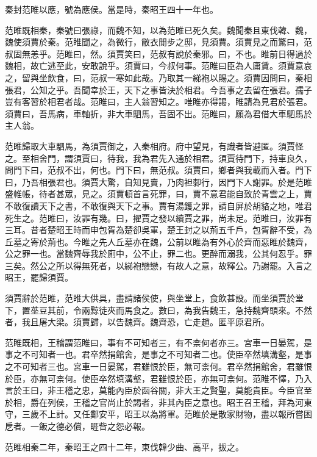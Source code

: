秦封范睢以應，號為應侯。當是時，秦昭王四十一年也。

范睢既相秦，秦號曰張祿，而魏不知，以為范睢已死久矣。魏聞秦且東伐韓、魏，魏使須賈於秦。范睢聞之，為微行，敝衣閒步之邸，見須賈。須賈見之而驚曰，范叔固無恙乎。范睢曰，然。須賈笑曰，范叔有說於秦邪。曰，不也。睢前日得過於魏相，故亡逃至此，安敢說乎。須賈曰，今叔何事。范睢曰臣為人庸賃。須賈意哀之，留與坐飲食，曰，范叔一寒如此哉。乃取其一綈袍以賜之。須賈因問曰，秦相張君，公知之乎。吾聞幸於王，天下之事皆決於相君。今吾事之去留在張君。孺子豈有客習於相君者哉。范睢曰，主人翁習知之。唯睢亦得謁，睢請為見君於張君。須賈曰，吾馬病，車軸折，非大車駟馬，吾固不出。范睢曰，願為君借大車駟馬於主人翁。

范睢歸取大車駟馬，為須賈御之，入秦相府。府中望見，有識者皆避匿。須賈怪之。至相舍門，謂須賈曰，待我，我為君先入通於相君。須賈待門下，持車良久，問門下曰，范叔不出，何也。門下曰，無范叔。須賈曰，鄉者與我載而入者。門下曰，乃吾相張君也。須賈大驚，自知見賣，乃肉袒厀行，因門下人謝罪。於是范睢盛帷帳，待者甚眾，見之。須賈頓首言死罪，曰，賈不意君能自致於青雲之上，賈不敢復讀天下之書，不敢復與天下之事。賈有湯鑊之罪，請自屏於胡貉之地，唯君死生之。范睢曰，汝罪有幾。曰，擢賈之發以續賈之罪，尚未足。范睢曰，汝罪有三耳。昔者楚昭王時而申包胥為楚卻吳軍，楚王封之以荊五千戶，包胥辭不受，為丘墓之寄於荊也。今睢之先人丘墓亦在魏，公前以睢為有外心於齊而惡睢於魏齊，公之罪一也。當魏齊辱我於廁中，公不止，罪二也。更醉而溺我，公其何忍乎。罪三矣。然公之所以得無死者，以綈袍戀戀，有故人之意，故釋公。乃謝罷。入言之昭王，罷歸須賈。

須賈辭於范睢，范睢大供具，盡請諸侯使，與坐堂上，食飲甚設。而坐須賈於堂下，置莝豆其前，令兩黥徒夾而馬食之。數曰，為我告魏王，急持魏齊頭來。不然者，我且屠大梁。須賈歸，以告魏齊。魏齊恐，亡走趙。匿平原君所。

范睢既相，王稽謂范睢曰，事有不可知者三，有不柰何者亦三。宮車一日晏駕，是事之不可知者一也。君卒然捐館舍，是事之不可知者二也。使臣卒然填溝壑，是事之不可知者三也。宮車一日晏駕，君雖恨於臣，無可柰何。君卒然捐館舍，君雖恨於臣，亦無可柰何。使臣卒然填溝壑，君雖恨於臣，亦無可柰何。范睢不懌，乃入言於王曰，非王稽之忠，莫能內臣於函谷關，非大王之賢聖，莫能貴臣。今臣官至於相，爵在列侯，王稽之官尚止於謁者，非其內臣之意也。昭王召王稽，拜為河東守，三歲不上計。又任鄭安平，昭王以為將軍。范睢於是散家財物，盡以報所嘗困戹者。一飯之德必償，睚眥之怨必報。

范睢相秦二年，秦昭王之四十二年，東伐韓少曲、高平，拔之。

